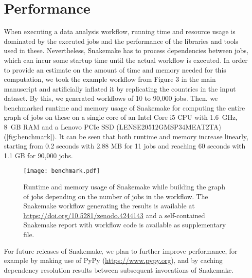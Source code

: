 \documentclass{scrartcl}
\let\plainurl\url
\renewcommand{\url}[1]{\protect\plainurl{#1}}
\begin{document}
\section{Performance}\label{sec:performance}

When executing a data analysis workflow, running time and resource usage is dominated by the executed jobs and the performance of the libraries and tools used in these.
Nevertheless, Snakemake has to process dependencies between jobs, which can incur some startup time until the actual workflow is executed.
In order to provide an estimate on the amount of time and memory needed for this computation, we took the example workflow from Figure 3 in the main manuscript and artificially inflated it by replicating the countries in the input dataset.
By this, we generated workflows of 10 to 90,000 jobs.
Then, we benchmarked runtime and memory usage of Snakemake for computing the entire graph of jobs on these on a single core of an Intel Core i5 CPU with 1.6~GHz, 8~GB RAM and a Lenovo PCIe SSD (LENSE20512GMSP34MEAT2TA) (\autoref{fig:benchmark}).
It can be seen that both runtime and memory increase linearly, starting from 0.2 seconds with 2.88 MB for 11 jobs and reaching 60 seconds with 1.1 GB for 90,000 jobs.

\begin{figure}
 \centering
 \texttt{[image: benchmark.pdf]}
 \caption{Runtime and memory usage of Snakemake while building the graph of jobs depending on the number of jobs in the workflow. The Snakemake workflow generating the results is available at \url{https://doi.org/10.5281/zenodo.4244143} and a self-contained Snakemake report with workflow code is available as supplementary file.}\label{fig:benchmark}
\end{figure}

For future releases of Snakemake, we plan to further improve performance, for example by making use of PyPy (\url{https://www.pypy.org}), and by caching dependency resolution results between subsequent invocations of Snakemake.


\printbibliography
\end{document}
